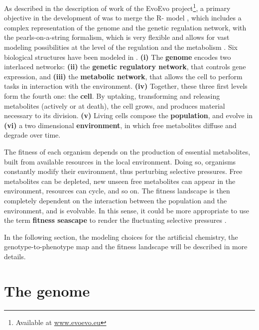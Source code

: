 As described in the description of work of the EvoEvo project\footnote{Available at \href{www.evoevo.eu}{www.evoevo.eu}}, a primary objective in the development of {\EvoEvoSim} was to merge the R-{\aevol} model \citep{beslon-et-al-2010a}, which includes a complex representation of the genome and the genetic regulation network, with the pearls-on-a-string formalism, which is very flexible and allows for vast modeling possibilities at the level of the regulation and the metabolism \citep{crombach-hogeweg-2007,crombach-hogeweg-2008,crombach-hogeweg-2009}.
Six biological structures have been modeled in {\EvoEvoSim}.
\textbf{(i)} The \textbf{genome} encodes two interlaced networks: \textbf{(ii)} the \textbf{genetic regulatory network}, that controls gene expression, and \textbf{(iii)} the \textbf{metabolic network}, that allows the cell to perform tasks in interaction with the environment. \textbf{(iv)} Together, these three first levels form the fourth one: the \textbf{cell}. By uptaking, transforming and releasing metabolites (actively or at death), the cell grows, and produces material necessary to its division.
\textbf{(v)} Living cells compose the \textbf{population}, and evolve in \textbf{(vi)} a two dimensional \textbf{environment}, in which free metabolites diffuse and degrade over time.

The fitness of each organism depends on the production of essential metabolites, built from available resources in the local environment. Doing so, organisms constantly modify their environment, thus perturbing selective pressures. Free metabolites can be depleted, new unseen free metabolites can appear in the environment, resources can cycle, and so on. The fitness landscape is then completely dependent on the interaction between the population and the environment, and is evolvable. In this sense, it could be more appropriate to use the term \textbf{fitness seascape} to render the fluctuating selective pressures \citep{mustonen-lassig-2009}.

In the following section, the modeling choices for the artificial chemistry, the genotype-to-phenotype map and the fitness landscape will be described in more details.


\section{The genome}
\label{sec:part2:methodology:genome}

